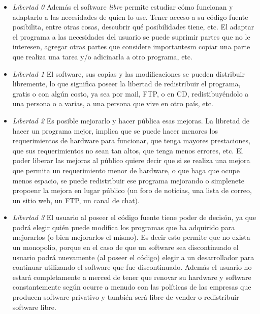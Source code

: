 \documentclass[a4paper,11pt]{article}
\begin{document}
\begin {itemize}
\item
 \textit{Libertad 0} Además el software \textit{libre} permite estudiar cómo funcionan y adaptarlo a las necesidades de quien lo use. Tener acceso a su código fuente posibilita, entre otras cosas, descubrir qué posibilidades tiene, etc. El adaptar el programa a las necesidades del usuario se puede suprimir partes que no le interesen, agregar otras partes que considere importantesm copiar una parte que realiza una tarea y/o adicinarla a otro programa, etc.

\item
\textit{Libertad 1} El software, sus copias y las modificaciones se pueden distribuir libremente, lo que significa poseer la libertad de redistribuir el programa, gratis o con algún costo, ya sea por mail, FTP, o en CD, redistibuyéndolo a una persona o a varias, a una persona que vive en otro país, etc.

\item 
\textit{Libertad 2} Es posible mejorarlo y hacer pública esas mejoras. La libretad de hacer un programa mejor, implica que se puede hacer menores los requerimientos de hardware para funcionar, que tenga mayores prestaciones, que sus requerimientos no sean tan altos, que tenga menos errores, etc. El poder liberar las mejoras al público quiere decir que si se realiza una mejora que permita un requerimiento menor de hardware, o que haga que ocupe menos espacio, se puede redistribuir ese programa mejorando o simplenete propoenr la mejora en lugar público (un foro de noticias, una lista de correo, un sitio web, un FTP, un canal de chat).

\item 
\textit{Libertad 3} El usuario al poseer el código fuente tiene poder de decisón, ya que podrá elegir quién puede modifica los programas que ha adquirido para mejorarlos (o bien mejorarlos el mismo). Es decir esto permite que no exista un monopolio, porque en el caso de que un software sea discontinuado el usuario podrá nuevamente (al poseer el código) elegir a un desarrollador para continuar utilizando el software que fue discontinuado. Además el usuario no estará completamente a merced de tener que renovar su hardware y software constantemente según ocurre a menudo con las políticas de las empresas que producen software privativo y también será libre de vender o redistribuir software libre.
 
 \end {itemize}
 
\end{document}
